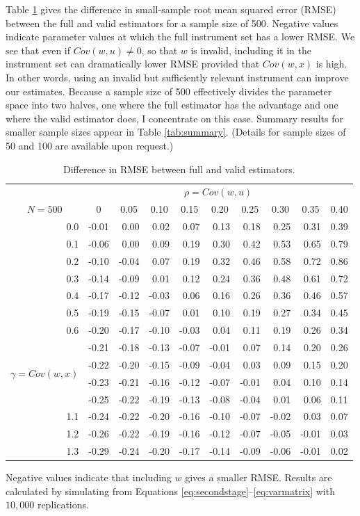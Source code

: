 \documentclass[12pt]{article}
\theoremstyle{definition}
\begin{document}
Table \ref{tab:trueRMSE} gives the difference in small-sample root mean squared error (RMSE) between the full and valid estimators for a sample size of 500. Negative values indicate parameter values at which the full instrument set has a lower RMSE. We see that even if $Cov(w,u)\neq 0$, so that $w$ is invalid, including it in the instrument set can dramatically lower RMSE provided that $Cov(w,x)$ is high. In other words, using an invalid but sufficiently relevant instrument can improve our estimates. Because a sample size of 500 effectively divides the parameter space into two halves, one where the full estimator has the advantage and one where the valid estimator does, I concentrate on this case. Summary results for smaller sample sizes appear in Table \ref{tab:summary}. (Details for sample sizes of 50 and 100 are available upon request.)
\begin{table}[!tbp]
\caption{Difference in RMSE between full and valid estimators.}

\label{tab:trueRMSE}

 \begin{center}
 \small
 \begin{tabular}{r|rrrrrrrrr}\hline\hline
&\multicolumn{9}{c}{$\rho = Cov(w,u)$}\\
\multicolumn{1}{c|}{$N = 500$}&\multicolumn{1}{c}{0}&\multicolumn{1}{c}{0.05}&\multicolumn{1}{c}{0.10}&\multicolumn{1}{c}{0.15}&\multicolumn{1}{c}{0.20}&\multicolumn{1}{c}{0.25}&\multicolumn{1}{c}{0.30}&\multicolumn{1}{c}{0.35}&\multicolumn{1}{c}{0.40}\tabularnewline
\hline
0.0&-0.01& 0.00& 0.02& 0.07& 0.13& 0.18& 0.25& 0.31&0.39\tabularnewline
0.1&-0.06& 0.00& 0.09& 0.19& 0.30& 0.42& 0.53& 0.65&0.79\tabularnewline
0.2&-0.10&-0.04& 0.07& 0.19& 0.32& 0.46& 0.58& 0.72&0.86\tabularnewline
0.3&-0.14&-0.09& 0.01& 0.12& 0.24& 0.36& 0.48& 0.61&0.72\tabularnewline
0.4&-0.17&-0.12&-0.03& 0.06& 0.16& 0.26& 0.36& 0.46&0.57\tabularnewline
0.5&-0.19&-0.15&-0.07& 0.01& 0.10& 0.19& 0.27& 0.34&0.45\tabularnewline
0.6&-0.20&-0.17&-0.10&-0.03& 0.04& 0.11& 0.19& 0.26&0.34\tabularnewline
\multirow{4}{5mm}{\begin{sideways}\parbox{1mm}{$\gamma\;$=$\;Cov(w,x)$}\end{sideways}}
0.7&-0.21&-0.18&-0.13&-0.07&-0.01& 0.07& 0.14& 0.20&0.26\tabularnewline
0.8&-0.22&-0.20&-0.15&-0.09&-0.04& 0.03& 0.09& 0.15&0.20\tabularnewline
0.9&-0.23&-0.21&-0.16&-0.12&-0.07&-0.01& 0.04& 0.10&0.14\tabularnewline
1.0&-0.25&-0.22&-0.19&-0.13&-0.08&-0.04& 0.01& 0.06&0.11\tabularnewline
1.1&-0.24&-0.22&-0.20&-0.16&-0.10&-0.07&-0.02& 0.03&0.07\tabularnewline
1.2&-0.26&-0.22&-0.19&-0.16&-0.12&-0.07&-0.05&-0.01&0.03\tabularnewline
1.3&-0.29&-0.24&-0.20&-0.17&-0.14&-0.09&-0.06&-0.01&0.02\tabularnewline
\hline
\end{tabular}

\end{center}
\footnotesize
\begin{tablenotes}
	\item Negative values indicate that including $w$ gives a smaller RMSE. Results are calculated by simulating from Equations \ref{eq:secondstage}--\ref{eq:varmatrix} with $10,000$ replications.
\end{tablenotes}
\end{table}
\end{document}
